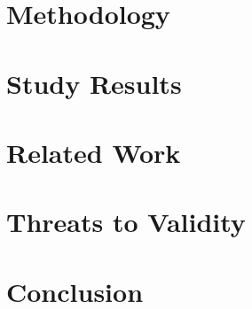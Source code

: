 \section{Methodology}
\label{Methodology}



\section{Study Results}
\label{studyresults}






\section{Related Work}
\label{related}


\section{Threats to Validity}
\label{threats}


\section{Conclusion}
\label{conc}










